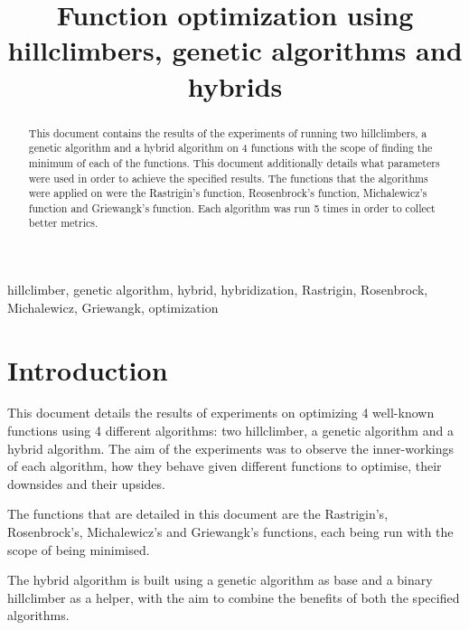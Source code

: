 \documentclass[conference]{IEEEtran}
\begin{document}
\title{Function optimization using hillclimbers, genetic algorithms and hybrids}

\author{
}

\maketitle


\begin{abstract}
This document contains the results of the experiments of running two hillclimbers, a genetic algorithm and a hybrid algorithm
on 4 functions with the scope of finding the minimum of each of the functions. This document additionally details what parameters
were used in order to achieve the specified results. The functions that the algorithms were applied on were the
Rastrigin's function, Reosenbrock's function, Michalewicz's function and Griewangk's function. Each algorithm was run 5
times in order to collect better metrics.
\end{abstract}

\begin{IEEEkeywords}
hillclimber, genetic algorithm, hybrid, hybridization, Rastrigin, Rosenbrock, Michalewicz, Griewangk, optimization
\end{IEEEkeywords}


\section{Introduction}
This document details the results of experiments on optimizing 4 well-known functions using 4 different algorithms: two hillclimber,
a genetic algorithm and a hybrid algorithm. The aim of the experiments was to observe the inner-workings of each algorithm,
how they behave given different functions to optimise, their downsides and their upsides.

The functions that are detailed in this document are the Rastrigin's, Rosenbrock's, Michalewicz's and Griewangk's functions,
each being run with the scope of being minimised.

The hybrid algorithm is built using a genetic algorithm as base and a binary hillclimber as a helper, with the aim to combine the
benefits of both the specified algorithms.
\end{document}
